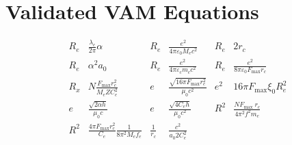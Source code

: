     \section*{Validated VAM Equations}\label{sec:validated-vam-equations}
    \begin{align*}
        R_e & \frac{\lambda_c}{2 \pi} \alpha & R_e & \frac{e^2}{4 \pi \varepsilon_0 M_e c^2} & R_e & 2 r_c \\
        R_e & \alpha^2 a_0 & R_e & \frac{e^2}{4 \pi \varepsilon_c m_c c^2} & R_e & \frac{e^2}{8 \pi \varepsilon_0 F_{\max} r_c} \\
        R_x & N \frac{F_{\max} r_c^2}{M_e Z C_e^2} & e & \frac{\sqrt{16 \pi F_{\max} r_c^2}}{\mu_0 c^2} & e^2 & 16 \pi F_{\max} \xi_0 R_e^2 \\
        e & \frac{\sqrt{2 \alpha h}}{\mu_0 c} & e & \frac{\sqrt{4 C_e h}}{\mu_0 c^2} & R^2 & \frac{N F_{\text {max }} r_c}{4 \pi^2 f^2 m_e} \\
        R^2 & \frac{4 \pi F_{\max} r_c^2}{C_e} \frac{1}{8 \pi^2 M_e f_e} & \frac{1}{r_c} & \frac{c^2}{a_0 2 C_e^2} &
    \end{align*}

